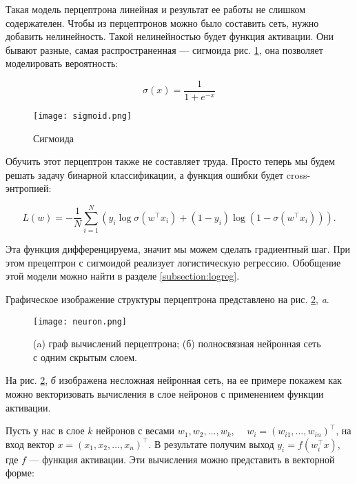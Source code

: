 \bigskip
Такая модель перцептрона линейная и результат ее работы не слишком содержателен. Чтобы из перцептронов можно
было составить сеть, нужно добавить нелинейность. Такой нелинейностью будет функция активации. Они бывают
разные, самая распространенная --- сигмоида рис. \ref{fig:sigmoid}, она позволяет моделировать вероятность:

\begin{equation} \label{eq:sigma}
    \sigma (x) = \frac{1}{1+e^{-x}}
\end{equation}

\begin{figure}[ht]
    \centering
    \texttt{[image: sigmoid.png]}
    \caption{Сигмоида}
    \label{fig:sigmoid}
\end{figure}

Обучить этот перцептрон также не составляет труда. Просто теперь мы будем решать задачу бинарной
классификации, а функция ошибки будет cross-энтропией:

\begin{equation}
 L(w) = -\frac{1}{N}\sum_{i=1}^N(y_i\log\sigma(w^\top x_i) + (1-y_i)\log(1-\sigma(w^\top x_i))).
\end{equation}

Эта функция дифференцируема, значит мы можем сделать градиентный шаг. При этом прецептрон с сигмоидой
реализует логистическую регрессию. Обобщение этой модели можно найти в разделе \ref{subsection:logreg}.

\bigskip
Графическое изображение структуры перцептрона представлено на рис. \ref{fig:neuron}, \textit{a}.

\begin{figure}[ht]
    \centering
    \texttt{[image: neuron.png]}
    \caption{(a) граф вычислений перцептрона; (б) полносвязная нейронная сеть с одним скрытым слоем.}
    \label{fig:neuron}
\end{figure}

На  рис. \ref{fig:neuron}, \textit{б} изображена несложная нейронная сеть, на ее примере покажем как можно векторизовать вычисления в слое нейронов с применением функции активации.

\bigskip
Пусть у нас в слое $k$ нейронов с весами $w_1, w_2, \ldots, w_k$, $\quad w_i = (w_{i1}, \ldots, w_{in})^\top$, на вход вектор $x = (x_1, x_2, \ldots, x_n)^\top$. В результате получим выход $y_i = f(w_i^\top x)$, где $f$ --- функция активации. Эти вычисления можно представить в векторной форме:

